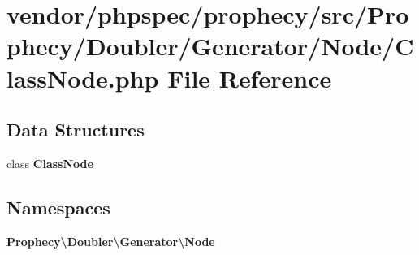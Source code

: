 \section{vendor/phpspec/prophecy/src/\+Prophecy/\+Doubler/\+Generator/\+Node/\+Class\+Node.php File Reference}
\label{phpspec_2prophecy_2src_2_prophecy_2_doubler_2_generator_2_node_2_class_node_8php}
\subsection*{Data Structures}
\begin{DoxyCompactItemize}
\item 
class {\bf Class\+Node}
\end{DoxyCompactItemize}
\subsection*{Namespaces}
\begin{DoxyCompactItemize}
\item 
 {\bf Prophecy\textbackslash{}\+Doubler\textbackslash{}\+Generator\textbackslash{}\+Node}
\end{DoxyCompactItemize}
